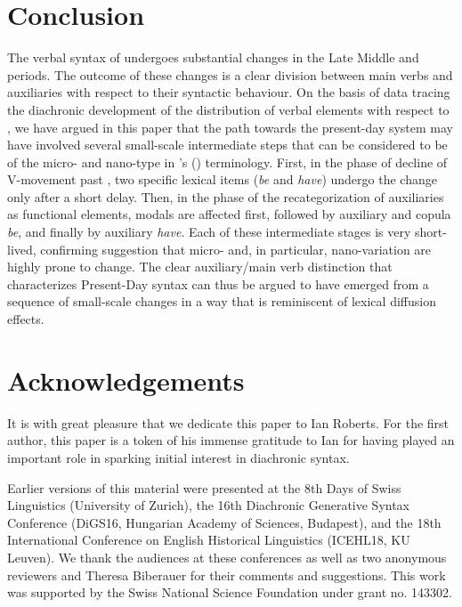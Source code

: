 \documentclass[output=paper]{langsci/langscibook}
\begin{document}
\section{Conclusion}

The verbal syntax of  undergoes substantial changes in the Late Middle
and  periods. The outcome of these changes is a clear
division between main verbs and auxiliaries with respect to their syntactic
behaviour. On the basis of data tracing the diachronic development of the
distribution of verbal elements with respect to , we have argued
in this paper that the path towards the present-day system may have involved
several small-scale intermediate steps that can be considered to be of the
micro- and nano-type in \citeauthor{BibRob2012b}'s
(\citeyear{BibRob2012b,BibRob2016}) terminology. First, in the phase of decline
of V-movement past , two specific lexical items
(\emph{be} and \emph{have}) undergo the change only after a short delay.  Then,
in the phase of the recategorization of auxiliaries as functional elements,
modals are affected first, followed by auxiliary and copula \emph{be},
and finally by auxiliary \emph{have}. Each of these intermediate stages is
very short-lived, confirming  suggestion that micro- and,
in particular, nano-variation are highly prone to change. The clear
auxiliary/main verb distinction that characterizes Present-Day  syntax
can thus be argued to have emerged from a sequence of small-scale changes in a
way that is reminiscent of lexical diffusion effects.

\printchapterglossary{}

\section*{Acknowledgements}

It is with great pleasure that we dedicate this paper to Ian Roberts. For the
first author, this paper is a token of his immense gratitude to Ian for having
played an important role in sparking initial interest in diachronic syntax.

Earlier versions of this material were presented at the 8th Days of Swiss
Linguistics (University of Zurich), the 16th Diachronic Generative Syntax
Conference (DiGS16, Hungarian Academy of Sciences, Budapest), and the 18th
International Conference on English Historical Linguistics (ICEHL18, KU
Leuven). We thank the audiences at these conferences as well as two anonymous
reviewers and Theresa Biberauer for their comments and suggestions. This work
was supported by the Swiss National Science Foundation under grant no. 143302.

{\sloppy
\printbibliography[heading=subbibliography,notkeyword=this]
}
\end{document}
